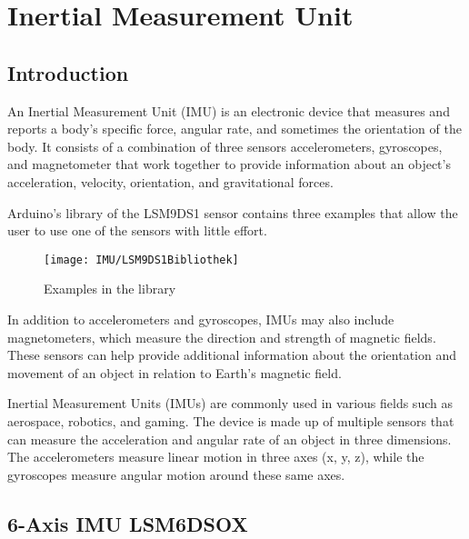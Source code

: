 %
%


\chapter{Inertial Measurement Unit}  \label{chap:InertialMeasurementUnit}


\section{Introduction}

An Inertial Measurement Unit (IMU) is an electronic device that measures and reports a body's specific force, angular rate, and sometimes the orientation of the body. It consists of a combination of three sensors accelerometers,  gyroscopes, and magnetometer that work together to provide information about an object's acceleration, velocity, orientation, and gravitational forces.\cite{sabatini:2011}



Arduino's library  of the LSM9DS1 sensor contains three examples that allow the user to use one of the sensors with little effort. 

\begin{figure}[H]
    \centering
    \texttt{[image: IMU/LSM9DS1Bibliothek]}
    \caption{Examples in the library }
\end{figure}



\bigskip

In addition to accelerometers and gyroscopes, IMUs may also include magnetometers, which measure the direction and strength of magnetic fields. These sensors can help provide additional information about the orientation and movement of an object in relation to Earth's magnetic field.\cite{Wang:2022}

\bigskip

Inertial Measurement Units (IMUs) are commonly used in various fields such as aerospace, robotics, and gaming. The device is made up of multiple sensors that can measure the acceleration and angular rate of an object in three dimensions. The accelerometers measure linear motion in three axes (x, y, z), while the gyroscopes measure angular motion around these same axes.\cite{wahyudi:2011}


\section{6-Axis IMU LSM6DSOX}


